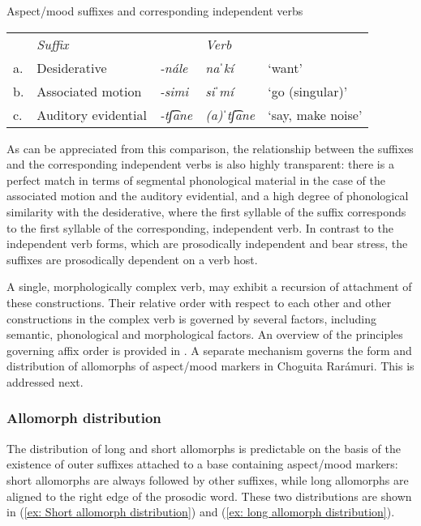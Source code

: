 \ea\label{ex: Aspect/mood suffixes and corresponding independent verbs}
{Aspect/mood suffixes and corresponding independent verbs}

\begin{tabular}{lllll}
       &  \textit{Suffix} & &\textit{Verb}\\
     a.& Desiderative &  \textit{-nále} & \textit{naˈkí}&	‘want’\\
     b.& {Associated motion}& {\textit{-simi}}&\textit{siˈmí}&	‘go (singular)’\\
     c.&{Auditory evidential} & \textit{-tʃ͡ane} &	\textit{(a)ˈtʃ͡ane}	&  ‘say, make noise'\\
\end{tabular}
    \z

As can be appreciated from this comparison, the relationship between the suffixes and the corresponding independent verbs is also highly transparent: there is a perfect match in terms of segmental phonological material in the case of the associated motion and the auditory evidential, and a high degree of phonological similarity with the desiderative, where the first syllable of the suffix corresponds to the first syllable of the corresponding, independent verb. In contrast to the independent verb forms, which are prosodically independent and bear stress, the suffixes are prosodically dependent on a verb host.

A single, morphologically complex verb, may exhibit a recursion of attachment of these constructions. Their relative order with respect to each other and other constructions in the complex verb is governed by several factors, including semantic, phonological and morphological factors. An overview of the principles governing affix order is provided in \citet{caballero2010scope}. A separate mechanism governs the form and distribution of allomorphs of aspect/mood markers in Choguita Rarámuri. This is addressed next.

\subsubsection{Allomorph distribution}
\label{subsubsec: allomorph distribution}


The distribution of long and short allomorphs is predictable on the basis of
the existence of
outer suffixes attached to a base containing aspect/mood markers: short allomorphs are always followed by other suffixes, while long allomorphs are aligned to the right edge of the prosodic word. These two distributions are shown in (\ref{ex: Short allomorph distribution}) and (\ref{ex: long allomorph distribution}).

